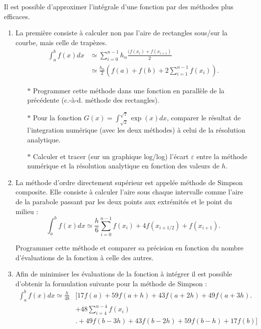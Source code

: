 Il est possible d'approximer l'intégrale d'une fonction par des
méthodes plus efficaces.
\begin{enumerate}
\item La  première consiste  à calculer non  pas l'aire  de rectangles
  sous/sur la courbe, mais celle de trapèzes.
  \begin{equation}
    \begin{split}
      \int_a^b        f(x)dx       &\simeq        \sum_{i=0}^{n-1}       h_n
      \frac{(f(x_i)+f(x_{i+1})}{2}\\ &\simeq \frac{h_n}{2} \left(f(a)+f(b) +
      2\sum_{i=1}^{n-1} f(x_i) \right).
    \end{split}
  \end{equation}
  \begin{itemize}
  \item[$\ast$] Programmer  cette  méthode dans une fonction en parallèle de la précédente
    (c.-à-d. méthode des rectangles).
  \item[$\ast$] Pour la fonction $G(x) = \int_{\sqrt{2}}^{\sqrt{7}} \exp(x) dx$,
    comparer le résultat de l'integration numérique (avec les deux méthodes) à celui de la résolution analytique.
  \item[$\ast$] Calculer et tracer (sur  un graphique  log/log) l'écart $\varepsilon$ entre la méthode numérique
    et la résolution analytique en   fonction  des  valeurs   de  $h$.
  \end{itemize}


\item La méthode d'ordre directement  supérieur est appelée méthode de
  Simpson  composite.  Elle  consiste  à calculer  l'aire sous  chaque
  intervalle comme l'aire  de la parabole passant par  les deux points
  aux extrémités et le point du milieu :
  \begin{equation}
    \int_a^b   f(x)dx  \simeq   \frac{h}{6}\sum_{i=0}^{n-1}  f(x_i)   +  4
    f(x_{i+1/2}) + f(x_{i+1}) .
  \end{equation}

  Programmer  cette méthode  et  comparer sa  précision  en fonction  du
  nombre d'évaluations de la fonction à celle des autres.
\item  Afin de minimiser les évaluations de la fonction à intégrer il est
possible d'obtenir la formulation suivante pour la méthode de Simpson :
 \begin{equation}
\begin{split}
\int_a^b  f(x)dx   \simeq  \frac{h}{48}  &\biggl[17f(a)   +  59f(a+h)+
  43f(a+2h)+
  49f(a+3h)\biggr.\\ &+48\sum_{i=4}^{n-4}f(x_i)\\ &\biggl.+49f(b-3h)+43f(b-2h)+59f(b-h)+17f(b)\biggr]
\end{split}
 \end{equation}


\end{enumerate}
